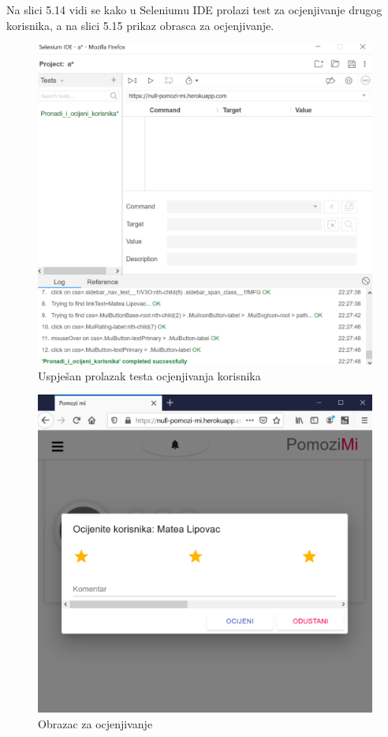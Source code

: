         \noindent \text 
        Na slici 5.14 vidi se kako u Seleniumu IDE prolazi test za ocjenjivanje drugog korisnika, a na slici 5.15 prikaz obrasca za ocjenjivanje. \\
		\begin{figure}[H]
                 \includegraphics[width=\textwidth, height=\textheight, keepaspectratio]{slike/ocjenjivanjeSel.png}
                \centering
                \caption{Uspješan prolazak testa ocjenjivanja korisnika}
        \end{figure}
		\begin{figure}[H]
                 \includegraphics[width=\textwidth, height=\textheight, keepaspectratio]{slike/ocjena.png}
                \centering
                \caption{Obrazac za ocjenjivanje}
        \end{figure}
			\eject 
